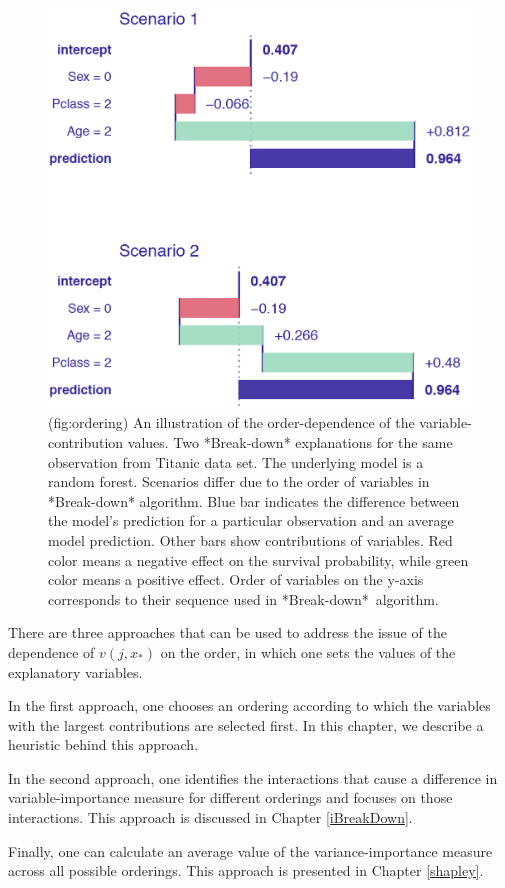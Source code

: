 \documentclass[12pt,]{krantz}
\begin{document}
\begin{figure}

{\centering \includegraphics[width=0.7\linewidth]{figure/ordering} 

}

\caption{(fig:ordering) An illustration of the order-dependence of the variable-contribution values. Two *Break-down* explanations for the same observation from Titanic data set. The underlying model is a random forest. Scenarios differ due to the order of variables in *Break-down* algorithm. Blue bar indicates the difference between the model's prediction for a particular observation and an average model prediction. Other bars show contributions of variables. Red color means a negative effect on the survival probability, while green color means a positive effect. Order of variables on the y-axis corresponds to their sequence used in *Break-down*~algorithm.}\label{fig:ordering}
\end{figure}

There are three approaches that can be used to address the issue of the dependence of \(v(j, x_*)\) on the order, in which one sets the values of the explanatory variables.

In the first approach, one chooses an ordering according to which the variables with the largest contributions are selected first. In this chapter, we describe a heuristic behind this approach.

In the second approach, one identifies the interactions that cause a difference in variable-importance measure for different orderings and focuses on those interactions. This approach is discussed in Chapter \ref{iBreakDown}.

Finally, one can calculate an average value of the variance-importance measure across all possible orderings. This approach is presented in Chapter \ref{shapley}.
\end{document}

